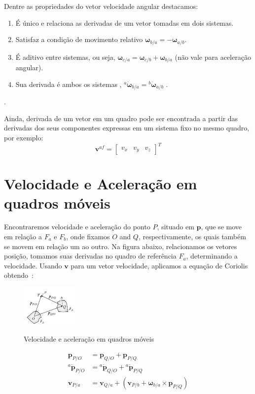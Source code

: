 Dentre as propriedades do vetor velocidade angular destacamos\footnotemark{}:
\begin{enumerate}[label=\alph*)]
\item É único e relaciona as derivadas de um vetor tomadas em dois sistemas.
\item Satisfaz a condição de movimento relativo \(\mathbf{\omega}_{b/a} = - \mathbf{\omega}_{a/b}\).
\item É aditivo entre sistemas, ou seja, \(\mathbf{\omega}_{c/a} = \!\mathbf{\omega}_{c/b} + \mathbf{\omega}_{b/a}\) (não vale para aceleração angular).
\item Sua derivada é ambos os sistemas , \({^{a}\dot{\mathbf{\omega}}_{b/a}} = {^{b}\dot{\mathbf{\omega}}_{a/b}} \) .
\end{enumerate}
.

Ainda, derivada de um vetor em um quadro pode ser encontrada a partir das derivadas dos seus componentes expressas em um sistema fixo no mesmo quadro, por exemplo:
\begin{equation*}
    \mathbf{v}^{a\!f} = \begin{bmatrix} v_{x} & v_{y} & v_{z} \end{bmatrix}^{T}
\end{equation*}

\section{Velocidade e Aceleração em quadros móveis}

Encontraremos velocidade e aceleração do ponto \(P\), situado em \(\mathbf{p}\), que se move em relação a \(F_{a}\) e \(F_{b}\), onde fixamos \(O\) and \(Q\), respectivamente, os quais também se movem em relação um ao outro. Na figura abaixo, relacionamos os vetores posição, tomamos suas derivadas no quadro de referência\footnotemark{} \(F_{a}\),  determinando a velocidade. Usando \(\mathbf{v}\) para um vetor velocidade, aplicamos a equação de Coriolis obtendo~\cite{Stevens2016}:
\begin{figure}[H]
    \centering
    \includegraphics[width=0.25\textwidth, keepaspectratio]{figuras/figure1.5-1.png}
    \label{fig1.5-1}
    \caption{Velocidade e aceleração em quadros móveis}
\end{figure}
\begin{align}
    \mathbf{p}_{P/O}             &= \mathbf{p}_{Q/O} + \mathbf{p}_{P/Q} \tag{1.5-1} \\
    {^{a}\dot{\mathbf{p}}_{P/O}} &= {^{a}\dot{\mathbf{p}}_{Q/O}} + {^{a}\dot{\mathbf{p}}_{P/Q}} \tag{1.5-2} \\
    \mathbf{v}_{P/a}             &= \mathbf{v}_{Q/a} + \left( \mathbf{v}_{P/b} + \mathbf{\omega}_{b/a}\!\times\!\mathbf{p}_{P/Q} \right) \tag{1.5-3}
\end{align}

